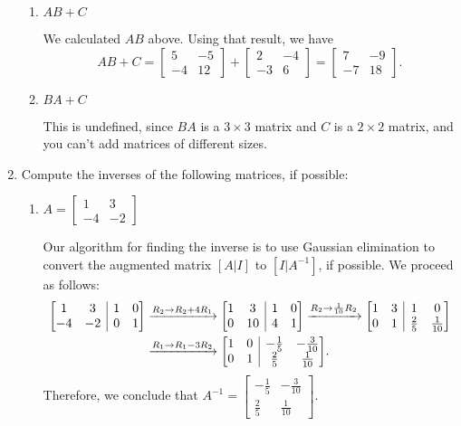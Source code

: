 \documentclass[12pt]{article}
\makeatletter
\newenvironment{aamatrix}[1]{%
  \left[\begin{array}{@{}*{#1}{c}|*{#1}{c}@{}}
}{%
  \end{array}\right]
}
\newcommand{\di}{\displaystyle}
\newcommand{\bbm}{\begin{bmatrix}}
\newcommand{\ebm}{\end{bmatrix}}
\makeatother
\begin{document}
\begin{enumerate}
\begin{enumerate}
 \item $AB+C$

We calculated $AB$ above. Using that result, we have
\[
 AB+C = \bbm 5&-5\\-4&12\ebm+\bbm 2&-4\\-3&6\ebm = \bbm 7&-9\\-7&18\ebm.
\]


 \item $BA+C$

\bigskip

This is undefined, since $BA$ is a $3\times 3$ matrix and $C$ is a $2\times 2$ matrix, and you can't add matrices of different sizes.
\end{enumerate}


\item Compute the inverses of the following matrices, if possible:
\begin{enumerate}
 \item $A=\di \bbm 1& 3\\-4&-2\ebm$

\bigskip

Our algorithm for finding the inverse is to use Gaussian elimination to convert the augmented matrix $[A|I]$ to $[I|A^{-1}]$, if possible. We proceed as follows:
\begin{align*}
 \begin{aamatrix}{2}
  1&3&1&0\\-4&-2&0&1
 \end{aamatrix} & \xrightarrow{R_2\to R_2+4R_1} \begin{aamatrix}{2}
                                                 1&3&1&0\\0&10&4&1
                                                \end{aamatrix} \xrightarrow{R_2\to \frac{1}{10}R_2} \begin{aamatrix}{2}
                                                                             1&3&1&0\\0&1&\frac{2}{5}&\frac{1}{10}
                                                                            \end{aamatrix}\\
& \xrightarrow{R_1\to R_1-3R_2} \begin{aamatrix}{2}
                                 1&0&-\frac{1}{5}&-\frac{3}{10}\\0&1&\frac{2}{5}&\frac{1}{10}
                                \end{aamatrix}.
\end{align*}
Therefore, we conclude that $A^{-1} = \bbm -\frac{1}{5}&-\frac{3}{10}\\\frac{2}{5}&\frac{1}{10}\ebm$.


\end{enumerate}
\end{enumerate}
\end{document}
